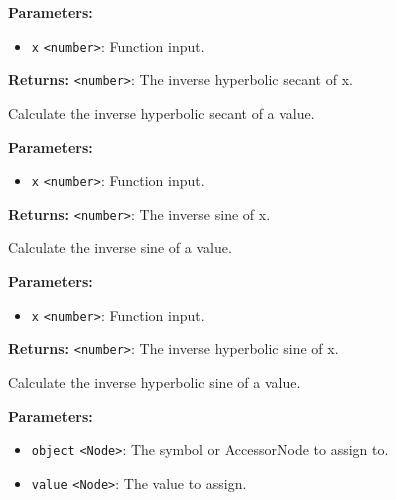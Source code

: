 \documentclass[12pt,a4paper]{article}
\begin{document}
\noindent \textbf{Parameters:}
\begin{itemize}
  \item \texttt{x} \texttt{<number>}: Function input.
\end{itemize}

\noindent \textbf{Returns:} \texttt{<number>}: The inverse hyperbolic secant of \textasciigrave{}x\textasciigrave{}.

\noindent Calculate the inverse hyperbolic secant of a value.

\vspace{5mm}
\noindent {}


\noindent \textbf{Parameters:}
\begin{itemize}
  \item \texttt{x} \texttt{<number>}: Function input.
\end{itemize}

\noindent \textbf{Returns:} \texttt{<number>}: The inverse sine of \textasciigrave{}x\textasciigrave{}.

\noindent Calculate the inverse sine of a value.

\vspace{5mm}
\noindent {}


\noindent \textbf{Parameters:}
\begin{itemize}
  \item \texttt{x} \texttt{<number>}: Function input.
\end{itemize}

\noindent \textbf{Returns:} \texttt{<number>}: The inverse hyperbolic sine of \textasciigrave{}x\textasciigrave{}.

\noindent Calculate the inverse hyperbolic sine of a value.

\vspace{5mm}
\noindent {}


\noindent \textbf{Parameters:}
\begin{itemize}
  \item \texttt{object} \texttt{<Node>}: The symbol or AccessorNode to assign to.
  \item \texttt{value} \texttt{<Node>}: The value to assign.
\end{itemize}
\end{document}
